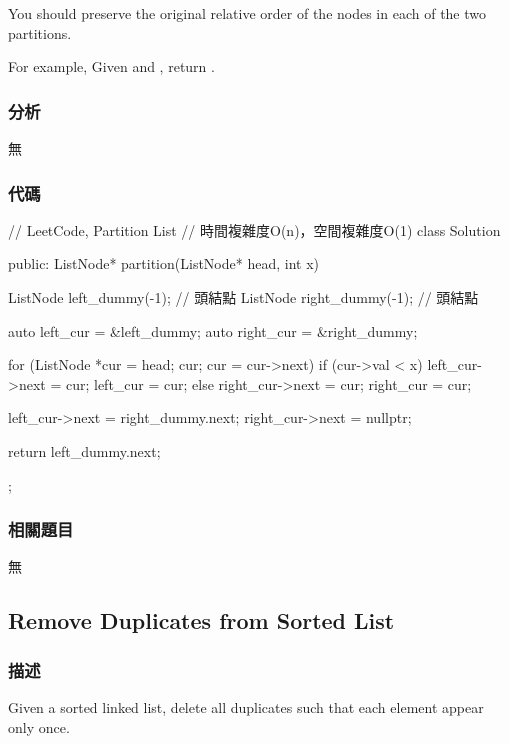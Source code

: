 You should preserve the original relative order of the nodes in each of the two partitions.

For example,
Given  and , return .


\subsubsection{分析}
無


\subsubsection{代碼}
\begin{Code}
// LeetCode, Partition List
// 時間複雜度O(n)，空間複雜度O(1)
class Solution {
public:
    ListNode* partition(ListNode* head, int x) {
        ListNode left_dummy(-1); // 頭結點
        ListNode right_dummy(-1); // 頭結點

        auto left_cur = &left_dummy;
        auto right_cur = &right_dummy;

        for (ListNode *cur = head; cur; cur = cur->next) {
            if (cur->val < x) {
                left_cur->next = cur;
                left_cur = cur;
            } else {
                right_cur->next = cur;
                right_cur = cur;
            }
        }

        left_cur->next = right_dummy.next;
        right_cur->next = nullptr;

        return left_dummy.next;
    }
};
\end{Code}


\subsubsection{相關題目}

\begindot
\item 無
\myenddot


\subsection{Remove Duplicates from Sorted List}
\label{sec:remove-duplicates-from-sorted-list}


\subsubsection{描述}
Given a sorted linked list, delete all duplicates such that each element appear only once.

